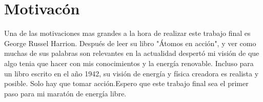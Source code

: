 \chapter*{Motivacón}
\thispagestyle{empty}
Una de las motivaciones mas grandes a la hora de realizar este trabajo final es George Russel Harrion. Después de leer su libro "Átomos en acción", y ver como muchas de sus palabras son relevantes en la actualidad despertó mi visión de que algo tenia que hacer con mis conocimientos y la energía renovable.  Incluso para un libro escrito en el año 1942, su visión de energía y física creadora es realista y posible. Solo hay que tomar acción.Espero que este trabajo final sea el primer paso para mi maratón de energía libre.